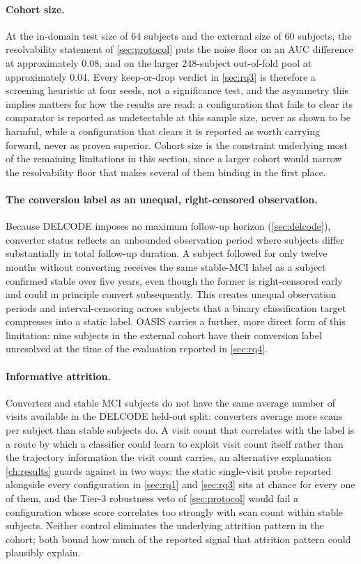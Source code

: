 \paragraph{Cohort size.} At the in-domain test size of 64 subjects and the external size of
60 subjects, the resolvability statement of \autoref{sec:protocol} puts the noise floor on
an \ac{AUC} difference at approximately 0.08, and on the larger 248-subject out-of-fold pool
at approximately 0.04. Every keep-or-drop verdict in \autoref{sec:rq3} is therefore a
screening heuristic at four seeds, not a significance test, and the asymmetry this implies
matters for how the results are read: a configuration that fails to clear its comparator is
reported as undetectable at this sample size, never as shown to be harmful, while a
configuration that clears it is reported as worth carrying forward, never as proven
superior. Cohort size is the constraint underlying most of the remaining limitations in this
section, since a larger cohort would narrow the resolvability floor that makes several of
them binding in the first place.

\paragraph{The conversion label as an unequal, right-censored observation.} Because \ac{DELCODE}
imposes no maximum follow-up horizon (\autoref{sec:delcode}), converter status reflects an
unbounded observation period where subjects differ substantially in total follow-up duration.
A subject followed for only twelve months without converting receives the same stable-\ac{MCI} label
as a subject confirmed stable over five years, even though the former is right-censored early and
could in principle convert subsequently. This creates unequal observation periods and interval-censoring
across subjects that a binary classification target compresses into a static label.
\ac{OASIS} carries a further, more direct form of this limitation: nine subjects in the external cohort
have their conversion label unresolved at the time of the evaluation reported in \autoref{sec:rq4}.

\paragraph{Informative attrition.} Converters and stable \ac{MCI} subjects do not have the
same average number of visits available in the \ac{DELCODE} held-out split: converters
average more scans per subject than stable subjects do. A visit count that correlates with
the label is a route by which a classifier could learn to exploit visit count itself rather
than the trajectory information the visit count carries, an alternative explanation
\autoref{ch:results} guards against in two ways: the static single-visit probe reported
alongside every configuration in \autoref{sec:rq1} and \autoref{sec:rq3} sits at chance for
every one of them, and the Tier-3 robustness veto of \autoref{sec:protocol} would fail a
configuration whose score correlates too strongly with scan count within stable subjects.
Neither control eliminates the underlying attrition pattern in the cohort; both bound how
much of the reported signal that attrition pattern could plausibly explain.

